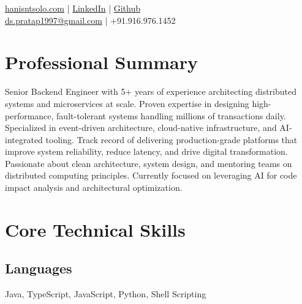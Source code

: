 \documentclass[]{hanisntsolo-resume}
\begin{document}

\lastupdated


{
{ \href{http://hanisntsolo.com}{hanisntsolo.com} | \href{https://www.linkedin.com/in/hanisntsolo}{LinkedIn} | \href{https://github.com/hanisntsolo}{Github} \\
\href{mailto:ds.pratap1997@gmail.com}{ds.pratap1997@gmail.com} | +91.916.976.1452
}
}

\sectionsep


\section{Professional Summary}

Senior Backend Engineer with 5+ years of experience architecting distributed systems and microservices at scale. Proven expertise in designing high-performance, fault-tolerant systems handling millions of transactions daily. Specialized in event-driven architecture, cloud-native infrastructure, and AI-integrated tooling. Track record of delivering production-grade platforms that improve system reliability, reduce latency, and drive digital transformation. Passionate about clean architecture, system design, and mentoring teams on distributed computing principles. Currently focused on leveraging AI for code impact analysis and architectural optimization.

\sectionsep


\section{Core Technical Skills}

\subsection{Languages}
Java, TypeScript, JavaScript, Python, Shell Scripting
\end{document}
